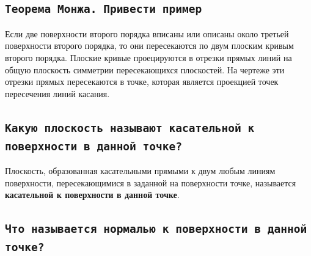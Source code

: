 
\newpage
\subsection{\texttt{Теорема Монжа. Привести пример}}

\begin{myquote}
    
\end{myquote}

Если две поверхности второго порядка вписаны или описаны около третьей поверхности второго порядка, то они пересекаются по двум плоским кривым второго порядка. Плоские кривые проецируются в отрезки прямых линий на общую плоскость симметрии пересекающихся плоскостей. На чертеже эти отрезки прямых пересекаются в точке, которая является проекцией точек пересечения линий касания.



\newpage
\subsection{\texttt{Какую плоскость называют касательной к поверхности в данной точке?}}

\begin{myquote}
    
\end{myquote}

Плоскость, образованная касательными прямыми к двум любым линиям поверхности, пересекающимися в заданной на поверхности точке, называется {\bf касательной к поверхности в данной точке}.



\newpage
\subsection{\texttt{Что называется нормалью к поверхности в данной точке?}}

\begin{myquote}
    
\end{myquote}

